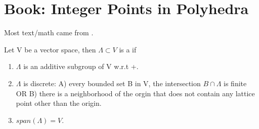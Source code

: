 \chapter{Book: Integer Points in Polyhedra}

Most text/math came from \cite{barvinokzurichbook}.

\begin{definition}
Let V be a vector space, then $\Lambda \subset V$ is a  if
\begin{enumerate}
	\item $\Lambda$ is an additive subgroup of V w.r.t +.
	\item $\Lambda$ is discrete: A) every bounded set B in V, the intersection $B \cap \Lambda$ is finite OR B) there is a neighborhood of the orgin that does not contain any lattice point other than the origin.
	\item $span(\Lambda) = V$.
\end{enumerate}
\end{definition}
 

